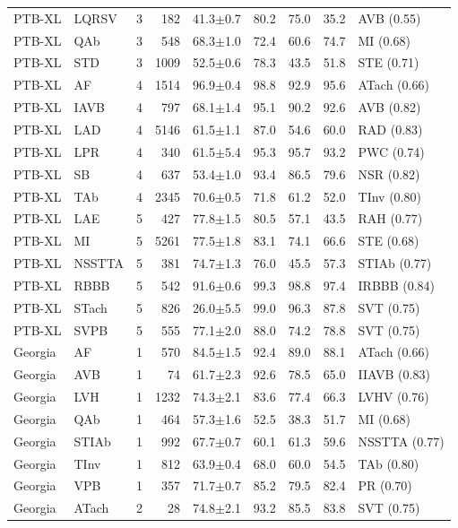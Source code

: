 \begin{longtable}{@{}llcrrrrrl@{}}
PTB-XL & LQRSV & 3 & 182 & 41.3$\pm$0.7 & 80.2 & 75.0 & 35.2 & AVB (0.55) \\
PTB-XL & QAb & 3 & 548 & 68.3$\pm$1.0 & 72.4 & 60.6 & 74.7 & MI (0.68) \\
PTB-XL & STD & 3 & 1009 & 52.5$\pm$0.6 & 78.3 & 43.5 & 51.8 & STE (0.71) \\
PTB-XL & AF & 4 & 1514 & 96.9$\pm$0.4 & 98.8 & 92.9 & 95.6 & ATach (0.66) \\
PTB-XL & IAVB & 4 & 797 & 68.1$\pm$1.4 & 95.1 & 90.2 & 92.6 & AVB (0.82) \\
PTB-XL & LAD & 4 & 5146 & 61.5$\pm$1.1 & 87.0 & 54.6 & 60.0 & RAD (0.83) \\
PTB-XL & LPR & 4 & 340 & 61.5$\pm$5.4 & 95.3 & 95.7 & 93.2 & PWC (0.74) \\
PTB-XL & SB & 4 & 637 & 53.4$\pm$1.0 & 93.4 & 86.5 & 79.6 & NSR (0.82) \\
PTB-XL & TAb & 4 & 2345 & 70.6$\pm$0.5 & 71.8 & 61.2 & 52.0 & TInv (0.80) \\
PTB-XL & LAE & 5 & 427 & 77.8$\pm$1.5 & 80.5 & 57.1 & 43.5 & RAH (0.77) \\
PTB-XL & MI & 5 & 5261 & 77.5$\pm$1.8 & 83.1 & 74.1 & 66.6 & STE (0.68) \\
PTB-XL & NSSTTA & 5 & 381 & 74.7$\pm$1.3 & 76.0 & 45.5 & 57.3 & STIAb (0.77) \\
PTB-XL & RBBB & 5 & 542 & 91.6$\pm$0.6 & 99.3 & 98.8 & 97.4 & IRBBB (0.84) \\
PTB-XL & STach & 5 & 826 & 26.0$\pm$5.5 & 99.0 & 96.3 & 87.8 & SVT (0.75) \\
PTB-XL & SVPB & 5 & 555 & 77.1$\pm$2.0 & 88.0 & 74.2 & 78.8 & SVT (0.75) \\
Georgia & AF & 1 & 570 & 84.5$\pm$1.5 & 92.4 & 89.0 & 88.1 & ATach (0.66) \\
Georgia & AVB & 1 & 74 & 61.7$\pm$2.3 & 92.6 & 78.5 & 65.0 & IIAVB (0.83) \\
Georgia & LVH & 1 & 1232 & 74.3$\pm$2.1 & 83.6 & 77.4 & 66.3 & LVHV (0.76) \\
Georgia & QAb & 1 & 464 & 57.3$\pm$1.6 & 52.5 & 38.3 & 51.7 & MI (0.68) \\
Georgia & STIAb & 1 & 992 & 67.7$\pm$0.7 & 60.1 & 61.3 & 59.6 & NSSTTA (0.77) \\
Georgia & TInv & 1 & 812 & 63.9$\pm$0.4 & 68.0 & 60.0 & 54.5 & TAb (0.80) \\
Georgia & VPB & 1 & 357 & 71.7$\pm$0.7 & 85.2 & 79.5 & 82.4 & PR (0.70) \\
Georgia & ATach & 2 & 28 & 74.8$\pm$2.1 & 93.2 & 85.5 & 83.8 & SVT (0.75) \\

\end{longtable}
